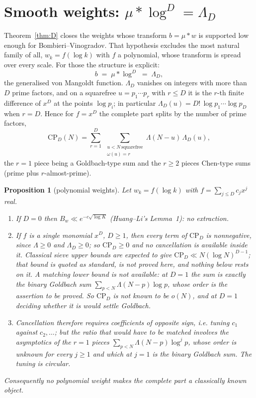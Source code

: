 \documentclass[11pt,a4paper]{article}
\theoremstyle{plain}
\newtheorem{proposition}[theorem]{Proposition}
\theoremstyle{definition}
\theoremstyle{remark}
\begin{document}
\section{Smooth weights:
\texorpdfstring{$\mu*\log^D=\Lambda_D$}{mu * log\^{}D = Lambda\_D}}%
\label{sec:Dpp}

Theorem~\ref{thm:D} closes the weights whose transform $b=\mu*w$ is
supported low enough for Bombieri--Vinogradov. That hypothesis
excludes the most natural family of all, $w_k=f(\log k)$ with $f$ a
polynomial, whose transform is spread over every scale. For those the
structure is explicit:
\[
  b\;=\;\mu*\log^D\;=\;\Lambda_D,
\]
the generalised von Mangoldt function. $\Lambda_D$ vanishes on
integers with more than $D$ prime factors, and on a squarefree
$u=p_1\cdots p_r$ with $r\le D$ it is the $r$-th finite difference of
$x^D$ at the points $\log p_i$; in particular
$\Lambda_D(u)=D!\,\log p_1\cdots\log p_D$ when $r=D$. Hence for
$f=x^D$ the complete part splits by the number of prime factors,
\begin{equation}\label{eq:CPD}
  \mathrm{CP}_D(N)=\sum_{r=1}^{D}\
    \sum_{\substack{u<N\ \text{squarefree}\\ \omega(u)=r}}
   \Lambda(N-u)\,\Lambda_D(u),
\end{equation}
the $r=1$ piece being a Goldbach-type sum and the $r\ge2$ pieces
Chen-type sums (prime plus $r$-almost-prime).

\begin{proposition}[polynomial weights]\label{prop:Dpp}
Let $w_k=f(\log k)$ with $f=\sum_{j\le D}c_jx^j$ real.
\begin{enumerate}
\item[(i)] If $D=0$ then $B_w\ll e^{-c\sqrt{\log K}}$ (Huang--Li's
Lemma~1): no extraction.
\item[(ii)] If $f$ is a single monomial $x^D$, $D\ge1$, then every
term of $\mathrm{CP}_D$ is nonnegative, since $\Lambda\ge0$ and
$\Lambda_D\ge0$; so $\mathrm{CP}_D\ge0$ and \emph{no cancellation is
available inside it}. Classical sieve upper bounds are expected to give
$\mathrm{CP}_D\ll N(\log N)^{D-1}$; that bound is quoted as standard,
is not proved here, and nothing below rests on it. A matching lower
bound is not
available: at $D=1$ the sum is exactly the binary Goldbach sum
$\sum_{p<N}\Lambda(N-p)\log p$, whose order is the assertion to be
proved. So $\mathrm{CP}_D$ is not known to be $o(N)$, and at $D=1$
deciding whether it is would settle Goldbach.
\item[(iii)] Cancellation therefore requires coefficients of opposite
sign, i.e. tuning $c_1$ against $c_2,\dots$; but the ratio that would
have to be matched involves the asymptotics of the $r=1$ pieces
$\sum_{p<N}\Lambda(N-p)\log^jp$, whose order is unknown for every
$j\ge1$ and which at $j=1$ \emph{is} the binary Goldbach sum. The
tuning is circular.
\end{enumerate}
Consequently no polynomial weight makes the complete part a
classically known object.
\end{proposition}
\end{document}
